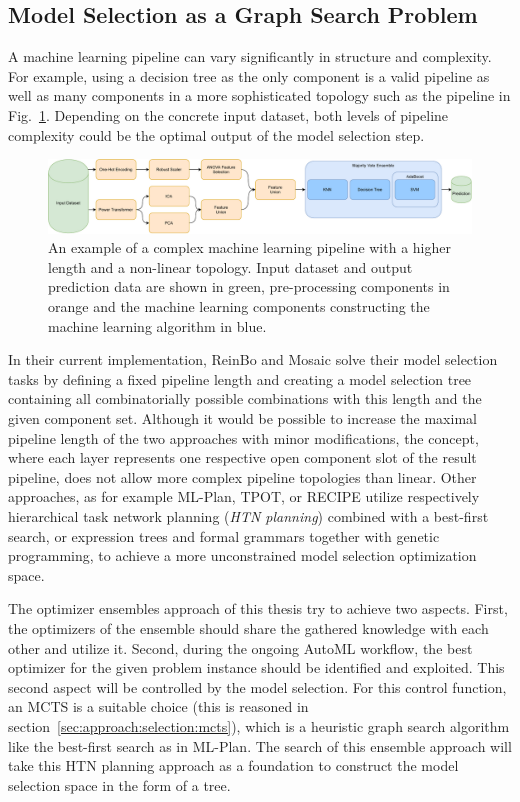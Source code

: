 \subsection{Model Selection as a Graph Search Problem}
\label{sec:approach:selection:search}
A machine learning pipeline can vary significantly in structure and complexity.
For example, using a decision tree as the only component is a valid pipeline as well as many components in a more sophisticated topology such as the pipeline in Fig.~\ref{fig:approach:complex-pipeline}.
Depending on the concrete input dataset, both levels of pipeline complexity could be the optimal output of the model selection step.
\begin{figure}[ht!]
    \centering
    \includegraphics[width=\textwidth]{gfx/Figures/Approach/ComplexPipeline.pdf}
    \caption[An example of a complex machine learning pipeline with an increased length and a non-linear topology.]{An example of a complex machine learning pipeline with a higher length and a non-linear topology. Input dataset and output prediction data are shown in green, pre-processing components in orange and the machine learning components constructing the machine learning algorithm in blue.}
    \label{fig:approach:complex-pipeline}
\end{figure}

In their current implementation, ReinBo and Mosaic solve their model selection tasks by defining a fixed pipeline length and creating a model selection tree containing all combinatorially possible combinations with this length and the given component set. 
Although it would be possible to increase the maximal pipeline length of the two approaches with minor modifications, the concept, where each layer represents one respective open component slot of the result pipeline, does not allow more complex pipeline topologies than linear.\newline
Other approaches, as for example ML-Plan, TPOT, or RECIPE utilize respectively hierarchical task network planning (\textit{HTN planning}) combined with a best-first search, or expression trees and formal grammars together with genetic programming, to achieve a more unconstrained model selection optimization space.

The optimizer ensembles approach of this thesis try to achieve two aspects.
First, the optimizers of the ensemble should share the gathered knowledge with each other and utilize it.
Second, during the ongoing AutoML workflow, the best optimizer for the given problem instance should be identified and exploited.
This second aspect will be controlled by the model selection. 
For this control function, an MCTS is a suitable choice (this is reasoned in section~\ref{sec:approach:selection:mcts}), which is a heuristic graph search algorithm like the best-first search as in ML-Plan.
The search of this ensemble approach will take this HTN planning approach as a foundation to construct the model selection space in the form of a tree.

